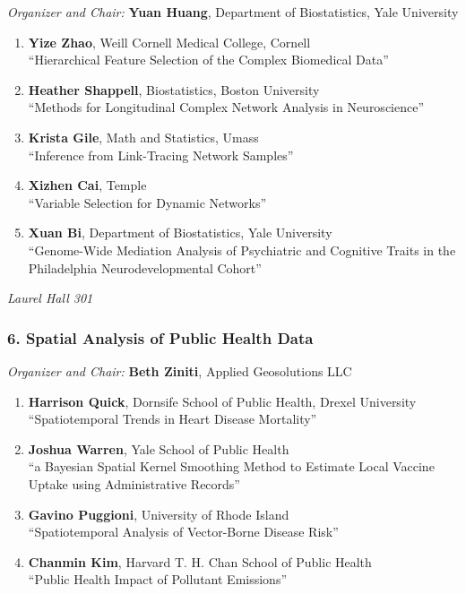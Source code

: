 \emph{Organizer and Chair:} \textbf{Yuan Huang}, Department of Biostatistics, Yale University

\begin{enumerate}
\item \textbf{Yize Zhao}, Weill Cornell Medical College, Cornell \\
``Hierarchical Feature Selection of the Complex Biomedical Data''
\item \textbf{Heather Shappell}, Biostatistics, Boston University \\
``Methods for Longitudinal Complex Network Analysis in Neuroscience''
\item \textbf{Krista Gile}, Math and Statistics, Umass \\
``Inference from Link-Tracing Network Samples''
\item \textbf{Xizhen Cai}, Temple \\
``Variable Selection for Dynamic Networks''
\item \textbf{Xuan Bi}, Department of Biostatistics, Yale University \\
``Genome-Wide Mediation Analysis of Psychiatric and Cognitive Traits in the Philadelphia Neurodevelopmental Cohort''
\end{enumerate}

\emph{Laurel Hall 301} \\[.5em]

\subsubsection*{6. Spatial Analysis of Public Health Data}

\emph{Organizer and Chair:} \textbf{Beth Ziniti}, Applied Geosolutions LLC

\begin{enumerate}
\item \textbf{Harrison Quick}, Dornsife School of Public Health, Drexel University \\
``Spatiotemporal Trends in Heart Disease Mortality''
\item \textbf{Joshua Warren}, Yale School of Public Health \\
``a Bayesian Spatial Kernel Smoothing Method to Estimate Local Vaccine Uptake using Administrative Records''
\item \textbf{Gavino Puggioni}, University of Rhode Island \\
``Spatiotemporal Analysis of Vector-Borne Disease Risk''
\item \textbf{Chanmin Kim}, Harvard T. H. Chan School of Public Health \\
``Public Health Impact of Pollutant Emissions''
\end{enumerate}

